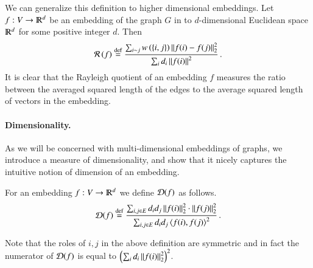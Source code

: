 \documentclass[11pt]{article}
\newcommand{\trudim}{\cD}
\newcommand{\ralsymb}{\cR}
\newcommand{\ral}[1]{\ralsymb\left(#1\right)} %
\begin{document}
We can generalize this definition to higher dimensional embeddings. 
%
Let $f: V \to \R^d$ be an embedding of the graph $G$ in to $d$-dimensional
Euclidean space $\R^d$ for some positive integer $d$. 
%
Then   
\[ \ral{f} \defeq \frac{\sum_{i\sim j} w\paren{\set{i,j}} \norm{f(i)-f(j)}_2^2}{\sum_i d_i \norm{f(i)}^2} \mper \]
%
It is clear that the Rayleigh quotient  of an embedding $f$ measures the ratio between
the averaged squared length of the edges to the average squared length
of vectors in the embedding.


\paragraph{Dimensionality.}
%
%
As we will be concerned with multi-dimensional embeddings of graphs,
we introduce a measure of dimensionality, and show that it nicely
captures the intuitive notion of dimension of an embedding. 
%
\begin{definition}
For an embedding $f: V \to \R^d$  we define $\trudim(f)$ as follows.
%
	\[ \trudim(f) \defeq \frac{\sum_{i,j \in E} d_i d_j \norm{f(i)}_2^2 \cdot \norm{f(j)}_2^2}
			{\sum_{i,j \in E} d_i d_j \inprod{f(i),f(j)}^2 } \mper \]
\end{definition}
%
Note that the roles of $i,j$ in the above definition are symmetric and
in fact the numerator of $\trudim(f)$ is equal to $\left( \sum_i d_i \left\lVert f(i)\right\rVert_2^2 \right )^2$.
\end{document}
